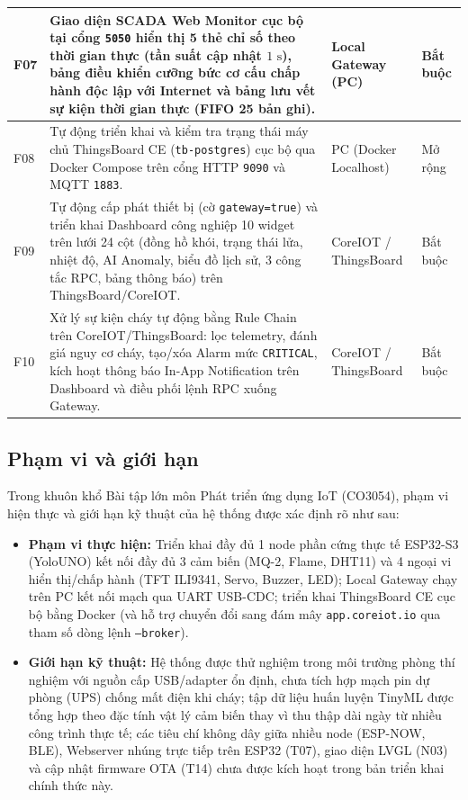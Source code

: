 {\begin{longtable}{|C{0.07\textwidth}|L{0.51\textwidth}|L{0.22\textwidth}|C{0.11\textwidth}|}
  \hline
  F07 & Giao diện SCADA Web Monitor cục bộ tại cổng \texttt{5050} hiển thị 5 thẻ chỉ số theo thời gian thực (tần suất cập nhật $1\text{ s}$), bảng điều khiển cưỡng bức cơ cấu chấp hành độc lập với Internet và bảng lưu vết sự kiện thời gian thực (FIFO 25 bản ghi). & Local Gateway (PC) & Bắt buộc \\
  \hline
  F08 & Tự động triển khai và kiểm tra trạng thái máy chủ ThingsBoard CE (\texttt{tb-postgres}) cục bộ qua Docker Compose trên cổng HTTP \texttt{9090} và MQTT \texttt{1883}. & PC (Docker Localhost) & Mở rộng \\
  \hline
  F09 & Tự động cấp phát thiết bị  (cờ \texttt{gateway=true}) và triển khai Dashboard công nghiệp 10 widget trên lưới 24 cột (đồng hồ khói, trạng thái lửa, nhiệt độ, AI Anomaly, biểu đồ lịch sử, 3 công tắc RPC, bảng thông báo) trên ThingsBoard/CoreIOT. & CoreIOT / ThingsBoard & Bắt buộc \\
  \hline
  F10 & Xử lý sự kiện cháy tự động bằng Rule Chain trên CoreIOT/ThingsBoard: lọc telemetry, đánh giá nguy cơ cháy, tạo/xóa Alarm mức \texttt{CRITICAL}, kích hoạt thông báo In-App Notification trên Dashboard và điều phối lệnh RPC xuống Gateway. & CoreIOT / ThingsBoard & Bắt buộc \\
  \hline
\end{longtable}
}

\subsection{Phạm vi và giới hạn}
\label{subsec:pham-vi-gioi-han}

Trong khuôn khổ Bài tập lớn môn Phát triển ứng dụng IoT (CO3054), phạm vi hiện thực và giới hạn kỹ thuật của hệ thống được xác định rõ như sau:
\begin{itemize}[leftmargin=*, itemsep=3pt]
  \item \textbf{Phạm vi thực hiện:} Triển khai đầy đủ 1 node phần cứng thực tế ESP32-S3 (YoloUNO) kết nối đầy đủ 3 cảm biến (MQ-2, Flame, DHT11) và 4 ngoại vi hiển thị/chấp hành (TFT ILI9341, Servo, Buzzer, LED); Local Gateway chạy trên PC kết nối mạch qua UART USB-CDC; triển khai ThingsBoard CE cục bộ bằng Docker (và hỗ trợ chuyển đổi sang đám mây \texttt{app.coreiot.io} qua tham số dòng lệnh \texttt{--broker}).
  \item \textbf{Giới hạn kỹ thuật:} Hệ thống được thử nghiệm trong môi trường phòng thí nghiệm với nguồn cấp USB/adapter ổn định, chưa tích hợp mạch pin dự phòng (UPS) chống mất điện khi cháy; tập dữ liệu huấn luyện TinyML được tổng hợp theo đặc tính vật lý cảm biến thay vì thu thập dài ngày từ nhiều công trình thực tế; các tiêu chí không dây giữa nhiều node (ESP-NOW, BLE), Webserver nhúng trực tiếp trên ESP32 (T07), giao diện LVGL (N03) và cập nhật firmware OTA (T14) chưa được kích hoạt trong bản triển khai chính thức này.
\end{itemize}

